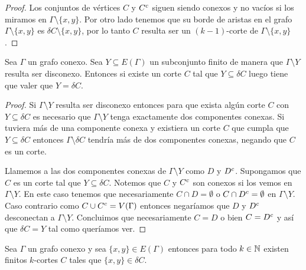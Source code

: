 \documentclass[tesis.tex]{subfiles}
\begin{document}
\begin{proof}
	Los conjuntos de vértices $C$ y $C^{c}$ siguen siendo conexos y no vacíos si los miramos en $\Gamma \setminus \{ x,y \}$.
	Por otro lado tenemos que su borde de aristas en el grafo $\Gamma \setminus \{x,y\}$ es $\delta C \setminus \{x,y\}$, por lo tanto $C$ resulta ser un $(k-1)$-corte de $\Gamma \setminus \{x,y\}$.
\end{proof}

\begin{lema}\label{lema_corte_disconexo_vertices}
	Sea $\Gamma$ un grafo conexo.
	Sea $Y \subseteq E(\Gamma)$ un subconjunto finito de manera que $\Gamma \setminus Y$ resulta ser disconexo.
	Entonces si existe un corte $C$ tal que $Y \subseteq \delta C$ luego tiene que valer que $Y = \delta C$.
\end{lema}

\begin{proof}
	Si $\Gamma \setminus Y$ resulta ser disconexo entonces para que exista algún corte $C$ con $Y \subseteq \delta C$ es necesario que $\Gamma \setminus Y$ tenga exactamente dos componentes conexas.
	Si tuviera más de una componente conexa y existiera un corte $C$ que cumpla que $Y \subseteq \delta C$ entonces $\Gamma \setminus \delta C$ tendría más de dos componentes conexas, negando que $C$ es un corte.	
	
	Llamemos a las dos componentes conexas de $\Gamma \setminus Y$ como $D$ y  $D^{c}$.
	Supongamos que $C$ es un corte tal que $Y \subseteq \delta C$. 
	Notemos que $C$ y $C^{c}$ son conexos si los vemos en $\Gamma \setminus Y$.
	En este caso tenemos que necesariamente $C \cap  D = \emptyset$ o $C \cap D^{c} = \emptyset$ en $\Gamma \setminus Y$.
	Caso contrario como $C \cup C^{c} = V(\Gamma)$ entonces negaríamos que $D$ y $D^{c}$ desconectan a $\Gamma \setminus Y$.
	Concluimos que necesariamente $C = D$ o bien $C = D^{c}$ y así que $\delta C = Y$ tal como queríamos ver.
	
\end{proof}

\begin{prop}\label{lema_aristas_finitos_kcortes}
	Sea $\Gamma$ un grafo conexo y sea $\{x,y\} \in E(\Gamma)$ entonces para todo $k \in \mathbb{N}$ existen finitos $k$-cortes $C$ tales que $\{x,y\} \in \delta C$.
\end{prop}
\end{document}
